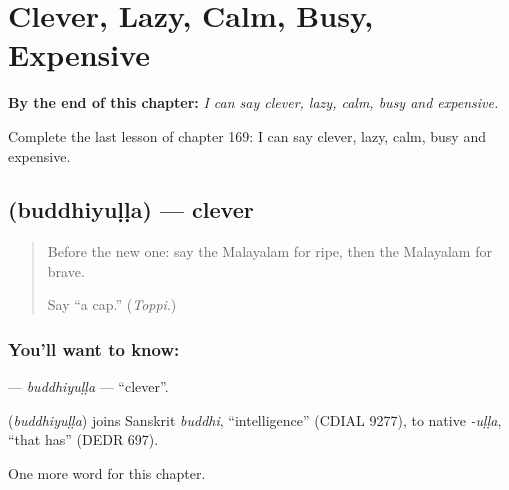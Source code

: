 
\chapter{Clever, Lazy, Calm, Busy, Expensive}
\label{ch:ml-clever-lazy-calm-busy-expensive}

\begin{chapteropening}
\textbf{By the end of this chapter:} \emph{I can say clever, lazy, calm, busy and expensive.}

Complete the last lesson of chapter 169: I can say clever, lazy, calm, busy and expensive.
\end{chapteropening}

\section[\texorpdfstring{\ml{ബുദ്ധിയുള്ള} (buddhiyuḷḷa)}{ബുദ്ധിയുള്ള (buddhiyuḷḷa)}]{ (buddhiyuḷḷa) — clever}

\label{lesson:ML-C169-buddhiyulla}



\begin{quote}
Before the new one: say the Malayalam for ripe, then the Malayalam for brave.

Say \textquotedblleft{}a cap.\textquotedblright{} (\emph{Toppi}.)
\end{quote}

\subsection*{You'll want to know: }
\textbf{} — \emph{buddhiyuḷḷa} — \textquotedblleft{}clever\textquotedblright{}.

\begin{cousinweb}
\textbf{} (\emph{buddhiyuḷḷa}) joins Sanskrit \emph{buddhi}, \textquotedblleft{}intelligence\textquotedblright{} (CDIAL 9277), to native \emph{-uḷḷa}, \textquotedblleft{}that has\textquotedblright{} (DEDR 697).
\end{cousinweb}

\begin{grammarlens}[title={What you've built}]
One more word for this chapter.
\end{grammarlens}

